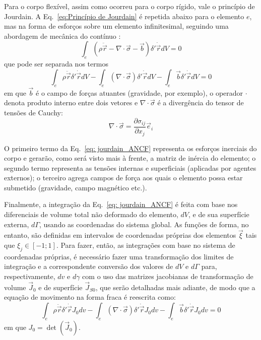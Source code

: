 Para o corpo flexível, assim como ocorreu para o corpo rígido, vale o princípio de Jourdain. A
Eq.~\eqref{eq:Princípio de Jourdain} é repetida abaixo para o elemento $e$, mas na forma de
esforços sobre um elemento infinitesimal, seguindo uma abordagem de mecânica do contínuo \cite{lai_introduction_2010,bittencourt_computational_2015}:
\begin{equation}
    \int_{e}{\left(\rho\ddot{\vec{r}} - \nabla{}\cdot\vec{\sigma} - \vec{b}\right) \delta'\dot{\vec{r}} dV} = 0
\end{equation}
que pode ser separada nos termos
\begin{equation}
    \int_{e}{\rho\ddot{\vec{r}} \delta'\dot{\vec{r}} dV} - \int_{e}{\left(\nabla{}\cdot\vec{\sigma}\right) \delta'\dot{\vec{r}} dV} - \int_{e}{\vec{b} \delta'\dot{\vec{r}} dV} = 0 \label{eq: jourdain_ANCF}
\end{equation}
em que $\vec{b}$ é o campo de forças atuantes (gravidade, por exemplo), o operador $\cdot$ denota produto interno entre dois vetores e $\nabla{}\cdot\vec{\sigma}$ é a divergência do tensor de tensões de Cauchy:
\begin{equation}
    \nabla{}\cdot\vec{\sigma} = \frac{\partial\sigma_{ij}}{\partial x_j}\vec{e}_i
\end{equation}

O primeiro termo da Eq.~\eqref{eq: jourdain_ANCF} representa os esforços inerciais do corpo e gerarão, como será visto mais à frente, a matriz de inércia do elemento; o segundo termo representa as tensões internas e superficiais (aplicadas por agentes externos); 
o terceiro agrega campos de força aos quais o elemento possa estar submetido (gravidade, campo magnético etc.).

Finalmente, a integração da Eq.~\eqref{eq: jourdain_ANCF} é feita com base nos diferenciais de volume total não deformado do elemento, $dV$, e de sua
superfície externa, $d\Gamma$, usando as coordenadas do sistema global. As funções de forma, no entanto, são definidas em intervalos de coordenadas
próprias dos elementos $\vec{\xi}$ tais que $\xi_j \in [-1;1]$. Para fazer, então, as integrações com base no sistema de coordenadas próprias,
é necessário fazer uma transformação dos limites de integração e a correspondente conversão dos valores de $dV$ e $d\Gamma$ para, respectivamente,
$dv$ e $d\gamma$ com o uso das matrizes
jacobianas de transformação de volume $\vec{J}_0$ e de superfície $\vec{J}_{S0}$, que serão detalhadas mais adiante, de modo que a equação de movimento na forma fraca é reescrita como:
\begin{equation}
    \int_{e}{\rho\ddot{\vec{r}} \delta'\dot{\vec{r}} J_0 dv} - \int_{e}{\left(\nabla{}\cdot\vec{\sigma}\right) \delta'\dot{\vec{r}} J_0 dv} - \int_{e}{\vec{b} \delta'\dot{\vec{r}} J_0 dv} = 0 \label{eq: jourdain_ANCF local}
\end{equation}
em que $J_0=\det(\vec{J}_0)$.

